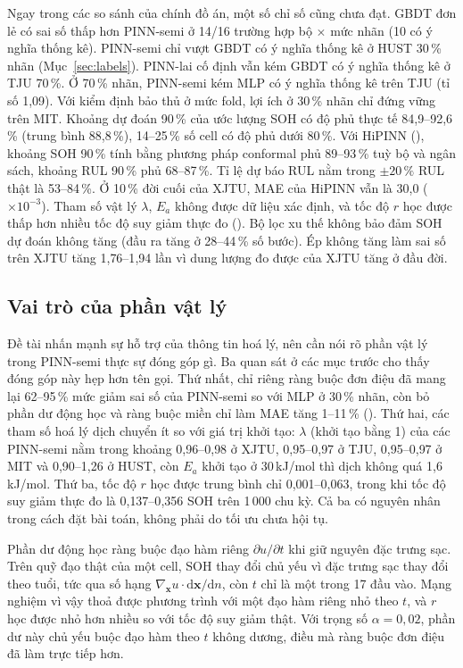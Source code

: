 Ngay trong các so sánh của chính đồ án, một số chỉ số cũng chưa đạt. GBDT đơn lẻ có sai số thấp hơn PINN-semi ở 14/16 trường hợp bộ $\times$ mức nhãn (10 có ý nghĩa thống kê). PINN-semi chỉ vượt GBDT có ý nghĩa thống kê ở HUST 30\,\% nhãn (Mục~\ref{sec:labels}). PINN-lai cố định vẫn kém GBDT có ý nghĩa thống kê ở TJU 70\,\%. Ở 70\,\% nhãn, PINN-semi kém MLP có ý nghĩa thống kê trên TJU (tỉ số 1{,}09). Với kiểm định bảo thủ ở mức fold, lợi ích ở 30\,\% nhãn chỉ đứng vững trên MIT. Khoảng dự đoán 90\,\% của ước lượng SOH có độ phủ thực tế 84{,}9--92{,}6\,\% (trung bình 88{,}8\,\%), 14--25\,\% số cell có độ phủ dưới 80\,\%. Với HiPINN (), khoảng SOH 90\,\% tính bằng phương pháp conformal phủ 89--93\,\% tuỳ bộ và ngân sách, khoảng RUL 90\,\% phủ 68--87\,\%. Tỉ lệ dự báo RUL nằm trong $\pm 20\,\%$ RUL thật là 53--84\,\%. Ở 10\,\% đời cuối của XJTU, MAE của HiPINN vẫn là 30{,}0 ($\times10^{-3}$). Tham số vật lý $\lambda$, $E_a$ không được dữ liệu xác định, và tốc độ $r$ học được thấp hơn nhiều tốc độ suy giảm thực đo (). Bộ lọc xu thế không bảo đảm SOH dự đoán không tăng (đầu ra tăng ở 28--44\,\% số bước). Ép không tăng làm sai số trên XJTU tăng 1{,}76--1{,}94 lần vì dung lượng đo được của XJTU tăng ở đầu đời.

\subsection{Vai trò của phần vật lý}\label{sec:vatly}
Đề tài nhấn mạnh sự hỗ trợ của thông tin hoá lý, nên cần nói rõ phần vật lý trong PINN-semi thực sự đóng góp gì. Ba quan sát ở các mục trước cho thấy đóng góp này hẹp hơn tên gọi. Thứ nhất, chỉ riêng ràng buộc đơn điệu đã mang lại 62--95\,\% mức giảm sai số của PINN-semi so với MLP ở 30\,\% nhãn, còn bỏ phần dư động học và ràng buộc miền chỉ làm MAE tăng 1--11\,\% (). Thứ hai, các tham số hoá lý dịch chuyển ít so với giá trị khởi tạo: $\lambda$ (khởi tạo bằng 1) của các PINN-semi nằm trong khoảng 0{,}96--0{,}98 ở XJTU, 0{,}95--0{,}97 ở TJU, 0{,}95--0{,}97 ở MIT và 0{,}90--1{,}26 ở HUST, còn $E_a$ khởi tạo ở 30\,kJ/mol thì dịch không quá 1{,}6\,kJ/mol. Thứ ba, tốc độ $r$ học được trung bình chỉ 0{,}001--0{,}063, trong khi tốc độ suy giảm thực đo là 0{,}137--0{,}356 SOH trên 1\,000 chu kỳ. Cả ba có nguyên nhân trong cách đặt bài toán, không phải do tối ưu chưa hội tụ.

Phần dư động học ràng buộc đạo hàm riêng $\partial u/\partial t$ khi giữ nguyên đặc trưng sạc. Trên quỹ đạo thật của một cell, SOH thay đổi chủ yếu vì đặc trưng sạc thay đổi theo tuổi, tức qua số hạng $\nabla_{\mathbf{x}} u \cdot \mathrm{d}\mathbf{x}/\mathrm{d}n$, còn $t$ chỉ là một trong 17 đầu vào. Mạng nghiệm vì vậy thoả được phương trình với một đạo hàm riêng nhỏ theo $t$, và $r$ học được nhỏ hơn nhiều so với tốc độ suy giảm thật. Với trọng số $\alpha = 0{,}02$, phần dư này chủ yếu buộc đạo hàm theo $t$ không dương, điều mà ràng buộc đơn điệu đã làm trực tiếp hơn.

